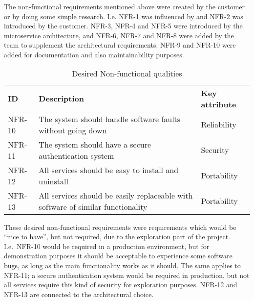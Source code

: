 The non-functional requirements mentioned above were created by the customer or by doing some simple research. I.e. NFR-1 was influenced by \citep{webResponseTime} and NFR-2 was introduced by the customer. NFR-3, NFR-4 and NFR-5 were introduced by the microservice architecture, and NFR-6, NFR-7 and NFR-8 were added by the team to supplement the architectural requirements. NFR-9 and NFR-10 were added for documentation and also maintainability purposes.

\begin{table}[H] 
   \caption{Desired Non-functional qualities}
   \centering
   \begin{tabular}{|p{1.5cm}|p{9.5cm}|p{4cm}|}\hline%
        ID & Description & Key attribute\\\hline\hline
        NFR-10 & The system should handle software faults without going down & Reliability \\ \hline
        NFR-11 & The system should have a secure authentication system & Security \\ \hline
        NFR-12 & All services should be easy to install and uninstall & Portability \\ \hline
        NFR-13 & All services should be easily replaceable with software of similar functionality & Portability \\ \hline
    \end{tabular}
   \label{table:nfq}
\end{table}

These desired non-functional requirements were requirements which would be ``nice to have'', but not required, due to the exploration part of the project. I.e.\ NFR-10 would be required in a production environment, but for demonstration purposes it should be acceptable to experience some software bugs, as long as the main functionality works as it should. The same applies to NFR-11; a secure authentication system would be required in production, but not all services require this kind of security for exploration purposes. NFR-12 and NFR-13 are connected to the architectural choice.
